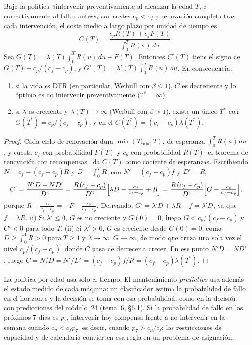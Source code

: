 \begin{proposicion}\label{prop:edad}
Bajo la política «intervenir preventivamente al alcanzar la edad $T$, o correctivamente al fallar antes», con costes $c_p<c_f$ y renovación completa tras cada intervención, el coste medio a largo plazo por unidad de tiempo es
\[
C(T)=\frac{c_pR(T)+c_fF(T)}{\int_0^{T}R(u)\,du}.
\]
Sea $G(T)=\lambda(T)\int_0^TR(u)\,du-F(T)$. Entonces $C'(T)$ tiene el signo de $G(T)-c_p/(c_f-c_p)$, y $G'(T)=\lambda'(T)\int_0^TR(u)\,du$. En consecuencia:
\begin{enumerate}
  \item si la vida es DFR (en particular, Weibull con $\beta\le1$), $C$ es decreciente y lo óptimo es no intervenir preventivamente ($T^{*}=\infty$);
  \item si $\lambda$ es creciente y $\lambda(T)\to\infty$ (Weibull con $\beta>1$), existe un único $T^{*}$ con $G(T^{*})=c_p/(c_f-c_p)$, y en él $C(T^{*})=(c_f-c_p)\lambda(T^{*})$.
\end{enumerate}
\end{proposicion}

\begin{proof}
Cada ciclo de renovación dura $\min(T_{\mathrm{vida}},T)$, de esperanza $\int_0^TR(u)\,du$, y cuesta $c_f$ con probabilidad $F(T)$ y $c_p$ con probabilidad $R(T)$; el teorema de renovación con recompensas~\cite[cap.~4]{bp} da $C(T)$ como cociente de esperanzas. Escribiendo $N=c_f-(c_f-c_p)R$ y $D=\int_0^TR$, con $N'=(c_f-c_p)f$ y $D'=R$,
\[
C'=\frac{N'D-ND'}{D^{2}}=\frac{R\,(c_f-c_p)}{D^{2}}\Bigl[\lambda D-\tfrac{c_f}{c_f-c_p}+R\Bigr]=\frac{R\,(c_f-c_p)}{D^{2}}\Bigl[G-\tfrac{c_p}{c_f-c_p}\Bigr],
\]
porque $R-\frac{c_f}{c_f-c_p}=-F-\frac{c_p}{c_f-c_p}$. Derivando, $G'=\lambda'D+\lambda R-f=\lambda'D$, ya que $f=\lambda R$. (i) Si $\lambda'\le0$, $G$ es no creciente y $G(0)=0$, luego $G<c_p/(c_f-c_p)$ y $C'<0$ para todo $T$. (ii) Si $\lambda'>0$, $G$ es creciente desde $G(0)=0$; como $D\ge\int_0^{1}R>0$ para $T\ge1$ y $\lambda\to\infty$, $G\to\infty$, de modo que cruza una sola vez el nivel $c_p/(c_f-c_p)$, donde $C$ pasa de decrecer a crecer. En ese punto $N'D=ND'$, luego $C=N/D=N'/D'=(c_f-c_p)f/R=(c_f-c_p)\lambda(T^{*})$.
\end{proof}

La política por edad usa solo el tiempo. El mantenimiento \emph{predictivo} usa además el estado medido de cada máquina: un clasificador estima la probabilidad de fallo en el horizonte y la decisión se toma con esa probabilidad, como en la decisión con predicciones del módulo~24 (tema~6, §6.1). Si la probabilidad de fallo en los próximos 7 días es $p_7$, intervenir hoy compensa frente a no intervenir en la semana cuando $c_p<c_fp_7$, es decir, cuando $p_7>c_p/c_f$; las restricciones de capacidad y de calendario convierten esa regla en un problema de asignación.

